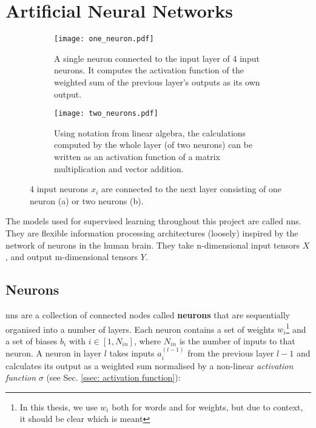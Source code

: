\section{Artificial Neural Networks \label{sec: neural nets}}

    \begin{figure}[h]
        \centering
        \begin{subfigure}[b]{0.9\textwidth}
            \texttt{[image: one\_neuron.pdf]}
            \caption{A single \gls{neuron} connected to the input layer of 4 input \glspl{neuron}. It computes the activation function of the weighted sum of the previous layer's outputs as its own output. \label{subfig: neuron}}
        \end{subfigure}
        \hfill
        \begin{subfigure}[b]{0.9\textwidth}
            \texttt{[image: two\_neurons.pdf]}
            \caption{Using notation from linear algebra, the calculations computed by the whole layer (of two \glspl{neuron}) can be written as an activation function of a matrix multiplication and vector addition. \label{subfig: layer}}
        \end{subfigure}
        \caption{4 input \glspl{neuron} $x_i$ are connected to the next layer consisting of one \gls{neuron} (a) or two \glspl{neuron} (b).}
    \end{figure}



    The \glspl{model} used for supervised learning throughout this project are called \glspl{nn}. They are flexible information processing architectures (loosely) inspired by the network of \glspl{neuron} in the human brain. They take n-dimensional input tensors $X$, and output m-dimensional tensors $Y$. %

    \subsection{Neurons}
        \Glspl{nn} are a collection of connected nodes called \textbf{\glspl{neuron}} that are sequentially organised into a number of layers. Each \gls{neuron} contains a set of weights $w_i$\footnote{In this thesis, we use $w_i$ both for words and for weights, but due to context, it should be clear which is meant} and a set of biases $b_i$ with $i \in [1, N_{in}]$, where $N_{in}$ is the number of inputs to that \gls{neuron}. A \gls{neuron} in layer $l$ takes inputs $a_i^{(l-1)}$ from the previous layer $l-1$ and calculates its output as a weighted sum normalised by a non-linear \textit{activation function} $\sigma$ (see Sec. \ref{ssec: activation function}):

